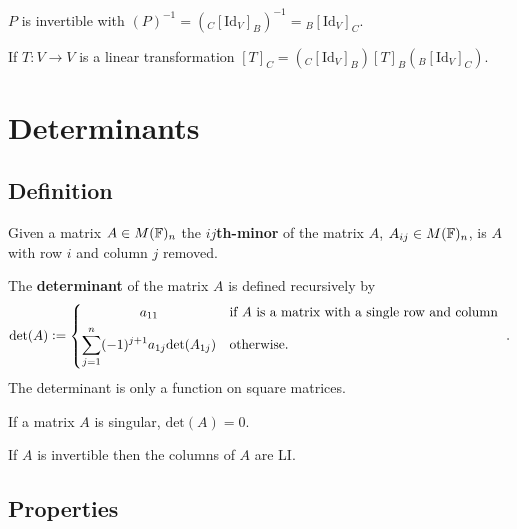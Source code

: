 \documentclass[../Year1.tex]{subfiles}
\begin{document}
\begin{corollary}
    $P$ is invertible with $(P)^{-1}= ({}_C[\text{Id}_V]_B)^{-1} = {}_B[\text{Id}_V]_C$. 
\end{corollary}

\begin{theorem}
    If $T:V\rightarrow V$ is a linear transformation $[T]_C = ({}_C[\text{Id}_V]_B)[T]_B({}_B[\text{Id}_V]_C)$.
\end{theorem}

\section{Determinants}

\subsection{Definition}

\begin{definition}
    Given a matrix $A\in M(\mathbb{F})_n$ the \textbf{$ij$th-minor} of the matrix $A$, $A_{ij}\in M(\mathbb{F})_n$, is $A$ with row $i$ and column $j$ removed.
\end{definition}

\begin{definition}[Determinant]
    The \textbf{determinant} of the matrix $A$ is defined recursively by \[
    \text{det}(A) := 
    \begin{dcases}
    \omit\hfil $a_{11}$\hfil & \textcolor{black}{\text{if }} A \textcolor{black}{\text{ is a matrix with a single row and column }}\\
    \sum_{j=1}^n (-1)^{j+1} a_{1j} \text{det}(A_{1j}) & \textcolor{black}{\text{otherwise.}}
    \end{dcases} 
    \textcolor{black}{.}
    \]
    The determinant is only a function on square matrices.
\end{definition}

\begin{theorem}
    If a matrix $A$ is singular, $\text{det}(A)=0$.
\end{theorem}

\begin{theorem}
    If $A$ is invertible then the columns of $A$ are LI.
\end{theorem}

\subsection{Properties}
\end{document}
